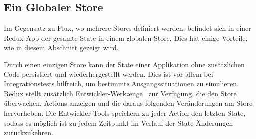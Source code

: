 \subsection{Ein Globaler Store}
\label{ssec:gr_ein_globaler_store}

Im Gegensatz zu Flux, wo mehrere Stores definiert werden, befindet sich in einer
Redux-App der gesamte State in einem globalen Store.  Dies hat einige Vorteile,
wie in diesem Abschnitt gezeigt wird.

Durch einen einzigen Store kann der State einer Applikation ohne zusätzlichen
Code persistiert und wiederhergestellt werden.  Dies ist vor allem bei
Integrationstests hilfreich, um bestimmte Ausgangssituationen zu simulieren.
Redux stellt zusätzlich Entwickler-Werkzeuge~\cite{reduxDevTools} zur
Verfügung, die den Store überwachen, Actions anzeigen und die daraus folgenden
Veränderungen am Store hervorheben.  Die Entwickler-Tools speichern zu jeder
Action den letzten State, sodass es möglich ist zu jedem Zeitpunkt im Verlauf
der State-Änderungen zurückzukehren.
